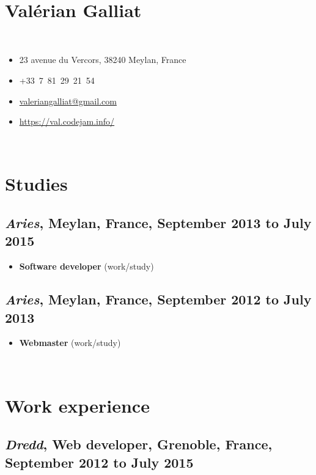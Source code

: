 \documentclass[a4paper]{article}
\begin{document}
~

\section*{\huge Valérian Galliat}

~

\begin{itemize}
  \item 23 avenue du Vercors, 38240 Meylan, France
  \item +33~7~81~29~21~54
  \item \href{mailto:valeriangalliat@gmail.com}{valeriangalliat@gmail.com}
  \item \url{https://val.codejam.info/}
\end{itemize}

~

\section*{Studies}

\subsection*{
  \textit{Aries},
  Meylan, France,
  September 2013 to July 2015
}

\begin{itemize}
  \item
    \textbf{Software developer}
    {\footnotesize (work/study)}
\end{itemize}

\subsection*{
  \textit{Aries},
  Meylan, France,
  September 2012 to July 2013
}

\begin{itemize}
  \item
    \textbf{Webmaster}
    {\footnotesize (work/study)}
\end{itemize}

~

\section*{Work experience}

\subsection*{
  \textit{Dredd},
  \textbf{Web developer},
  Grenoble, France,
  September 2012 to July 2015
}
\end{document}
